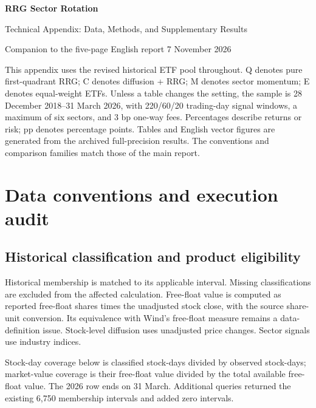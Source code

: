 
\renewcommand{\thesection}{\Alph{section}}
\renewcommand{\thetable}{\thesection\arabic{table}}
\renewcommand{\thefigure}{\thesection\arabic{figure}}

\small
\setlength{\parskip}{4pt}
{\LARGE\bfseries RRG Sector Rotation}\par
{\large Technical Appendix: Data, Methods, and Supplementary Results}\par
{\small Companion to the five-page English report \hfill 7 November 2026}

This appendix uses the revised historical ETF pool throughout. Q denotes pure first-quadrant RRG; C denotes diffusion + RRG; M denotes sector momentum; E denotes equal-weight ETFs. Unless a table changes the setting, the sample is 28 December 2018--31 March 2026, with 220/60/20 trading-day signal windows, a maximum of six sectors, and 3 bp one-way fees. Percentages describe returns or risk; pp denotes percentage points. Tables and English vector figures are generated from the archived full-precision results. The conventions and comparison families match those of the main report.

\section{Data conventions and execution audit}
\subsection{Historical classification and product eligibility}
Historical membership is matched to its applicable interval. Missing classifications are excluded from the affected calculation. Free-float value is computed as reported free-float shares times the unadjusted stock close, with the source share-unit conversion. Its equivalence with Wind's free-float measure remains a data-definition issue. Stock-level diffusion uses unadjusted price changes. Sector signals use industry indices.

Stock-day coverage below is classified stock-days divided by observed stock-days; market-value coverage is their free-float value divided by the total available free-float value. The 2026 row ends on 31 March. Additional queries returned the existing 6,750 membership intervals and added zero intervals.

\begingroup\footnotesize\setlength{\tabcolsep}{4pt}\renewcommand{\arraystretch}{1.1}

